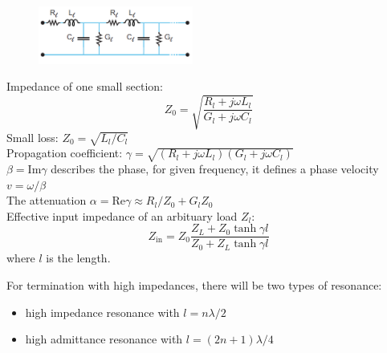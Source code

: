 \documentclass[8pt,a4paper,twocolumn]{article} %
\numberwithin{equation}{section} %
\begin{document}
			\begin{figure}[!h]
				\centering
				\includegraphics[width=2in]{transmissionLine.png}
				\label{pic:EnLevelOfJCH}
			\end{figure}
			Impedance of one small section:
			\begin{equation}
				Z_0=\sqrt{\frac{ R_l +j \omega L_l }{G_l + j \omega C_l}}
			\end{equation}
			Small loss: $ Z_0=\sqrt{L_l/C_l} $\\
			Propagation coefficient: $ \gamma=\sqrt{( R_l +j \omega L_l )(G_l + j \omega C_l)} $\\
			$ \beta=\text{Im} \gamma $ describes the phase, for given frequency, it defines a phase velocity $v=\omega/\beta$\\
			The attenuation $\alpha=\text{Re} \gamma \approx R_l/Z_0+G_l Z_0 $\\
			Effective input impedance of an arbituary load $ Z_l $:
			\begin{equation}
				Z_{\text{in}}=Z_0 \frac{Z_L+Z_0 \tanh \gamma l}{Z_0+Z_L\tanh \gamma l}
			\end{equation}
			where $l$ is the length.

			For termination with high impedances, there will be two types of resonance:
			\begin{itemize}
				\item high impedance resonance with $ l=n \lambda/2 $
				\item high admittance resonance with $ l=(2n+1)\lambda/4 $
			\end{itemize}

	
\end{document}
